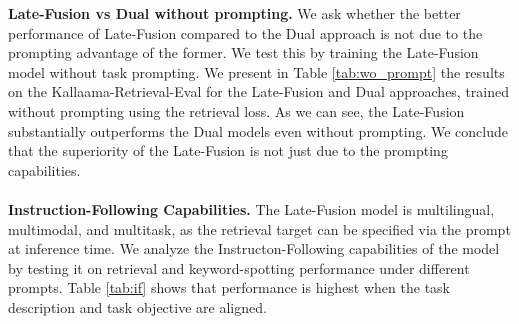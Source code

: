 \documentclass[11pt]{article}
\newcommand{\myparagraph}[1]{\noindent\textbf{#1}}
\begin{document}
\myparagraph{Late-Fusion vs Dual without prompting.}
We ask whether the better performance of Late-Fusion compared to the Dual approach is not due to the prompting advantage of the former. We test this by training the Late-Fusion model without task prompting. We present in Table \ref{tab:wo_prompt} the results on the Kallaama-Retrieval-Eval for the Late-Fusion and Dual approaches, trained without prompting using the retrieval loss. As we can see, the Late-Fusion substantially outperforms the Dual models even without prompting. We conclude that the superiority of the Late-Fusion is not just due to the prompting capabilities.
\\
\\
\myparagraph{Instruction-Following Capabilities.}
The Late-Fusion model is multilingual, multimodal, and multitask, as the retrieval target can be specified via the prompt at inference time. We analyze the Instructon-Following capabilities of the model by testing it on retrieval and keyword-spotting performance under different prompts. Table \ref{tab:if} shows that performance is highest when the task description and task objective are aligned.
\end{document}
